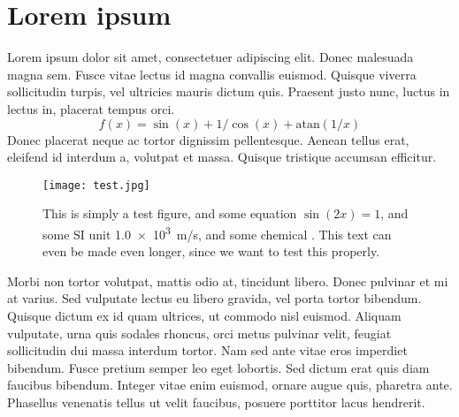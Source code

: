 %

\section{Lorem ipsum}
Lorem ipsum dolor sit amet, consectetuer adipiscing elit.
Donec malesuada magna sem.
Fusce vitae lectus id magna convallis euismod.
Quisque viverra sollicitudin turpis, vel ultricies mauris dictum quis.
Praesent justo nunc, luctus in lectus in, placerat tempus orci.
\begin{equation}
  f(x) = \sin(x) + 1/\cos(x) + \mathrm{atan}(1/x)
\end{equation}
Donec placerat neque ac tortor dignissim pellentesque.
Aenean tellus erat, eleifend id interdum a, volutpat et massa.
Quisque tristique accumsan efficitur.

\begin{figure}[h!]
  \centering
  \texttt{[image: test.jpg]}
  \caption{This is simply a test figure, and some equation $\sin(2x)=1$, and some SI unit \SI{1.0e3}{m/s}, and some chemical . This text can even be made even longer, since we want to test this properly.}
  \label{fig:test}
\end{figure}


Morbi non tortor volutpat, mattis odio at, tincidunt libero.
Donec pulvinar et mi at varius.
Sed vulputate lectus eu libero gravida, vel porta tortor bibendum.
Quisque dictum ex id quam ultrices, ut commodo nisl euismod.
Aliquam vulputate, urna quis sodales rhoncus, orci metus pulvinar velit, feugiat sollicitudin dui massa interdum tortor.
Nam sed ante vitae eros imperdiet bibendum.
Fusce pretium semper leo eget lobortis.
Sed dictum erat quis diam faucibus bibendum.
Integer vitae enim euismod, ornare augue quis, pharetra ante.
Phasellus venenatis tellus ut velit faucibus, posuere porttitor lacus hendrerit.

